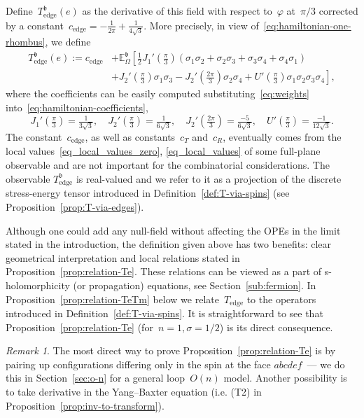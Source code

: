 \documentclass[reqno,11pt,a4paper]{amsart}
\theoremstyle{remark}
\newtheorem{remark}[proposition]{Remark}
\newcommand{\bbE}{\mathbb{E}}
\newcommand{\Te}{T_{\mathrm{edge}}}       \newcommand{\Ce}{c_{\mathrm{edge}}}
\newcommand{\CmT}{c_T}
\newcommand{\CmR}{c_R}
\renewcommand{\b}{\mathfrak{b}}
\begin{document}
Define~$\Te^{\b} (e)$ as the derivative of this field with respect to~$\varphi$ at~$\pi/3$ corrected by a constant~$\Ce = -\tfrac{1}{2\pi} + \tfrac{1}{4\sqrt{3}}$. More precisely, in view of~\eqref{eq:hamiltonian-one-rhombus}, we define
\begin{align}\label{eq:t-edge}
	\Te^{\b}(e) := \Ce &+ \bbE_{\Omega}^{\b}\left[\tfrac12 J_1'(\tfrac\pi{3}) (\sigma_1\sigma_2 + \sigma_2\sigma_3 + \sigma_3\sigma_4 + \sigma_4\sigma_1)\right.\\
		&\left.+ J_2'(\tfrac\pi{3}) \sigma_1\sigma_3
		- J_2'(\tfrac{2\pi}{3}) \sigma_2\sigma_4
		+ U'(\tfrac\pi{3}) \sigma_1\sigma_2\sigma_3\sigma_4\right], \nonumber
\end{align}
where the coefficients can be easily computed substituting~\eqref{eq:weights} into~\eqref{eq:hamiltonian-coefficients},
\[
	J_1'(\tfrac\pi{3}) = \tfrac{1}{3\sqrt{3}}, \quad 
	J_2'(\tfrac\pi{3}) = \tfrac{1}{6\sqrt{3}}, \quad 
	J_2'(\tfrac{2\pi}{3}) = \tfrac{-5}{6\sqrt{3}}, \quad 
	U'(\tfrac\pi{3}) = \tfrac{-1}{12\sqrt{3}}.
\]
The constant~$\Ce$, as well as constants~$\CmT$ and~$\CmR$, eventually comes from the local values~\eqref{eq_local_values_zero}, \eqref{eq_local_values} of some full-plane observable and are not important for the combinatorial considerations. The observable $\Te^{\b}$ is real-valued and we refer to it as a projection of the discrete stress-energy tensor introduced in Definition~\ref{def:T-via-spins} (see Proposition~\ref{prop:T-via-edges}).

Although one could add any null-field without affecting the OPEs in the limit stated in the introduction, the definition given above has two benefits: clear geometrical interpretation and local relations stated in Proposition~\ref{prop:relation-Te}.
These relations can be viewed as a part of s-holomorphicity (or propagation) equations, see Section~\ref{sub:fermion}.
In Proposition~\ref{prop:relation-TeTm} below we relate~$\Te$ to the operators introduced in Definition~\ref{def:T-via-spins}.
It is straightforward to see that Proposition~\ref{prop:relation-Te} (for~$n=1,\sigma=1/2$) is its direct consequence.

\begin{remark}
	The most direct way to prove Proposition~\ref{prop:relation-Te} is by pairing up configurations differing only in the spin at the face $abcdef$~--- we do this in Section~\ref{sec:o-n} for a general loop~$O(n)$ model.
	Another possibility is to take derivative in the Yang--Baxter equation (i.e. (T2) in Proposition~\ref{prop:inv-to-transform}). 
\end{remark}
\end{document}
